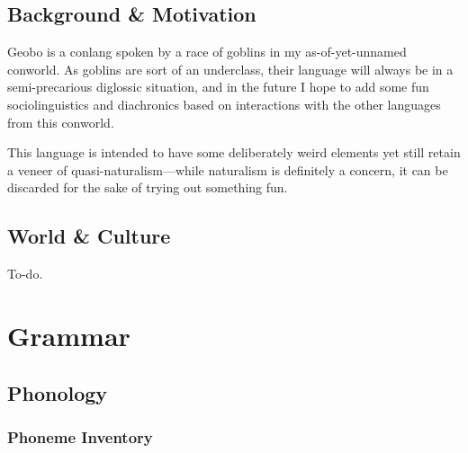 \documentclass[a4paper,11pt,oneside,openany]{memoir}
\begin{document}
\begin{titlingpage}
\titleP
\end{titlingpage}
\frontmatter

\pagestyle{headings}

\chapter{Background \& Motivation}

Geobo{\engma} is a conlang spoken by a race of goblins in my as-of-yet-unnamed conworld. As goblins are sort of an underclass, their language will always be in a semi-precarious diglossic situation, and in the future I hope to add some fun sociolinguistics and diachronics based on interactions with the other languages from this conworld.

This language is intended to have some deliberately weird elements yet still retain a veneer of quasi-naturalism---while naturalism is definitely a concern, it can be discarded for the sake of trying out something fun.

\clearpage
\tableofcontents


\printnoidxglossary[type=\leipzigtype,title={Glossing Abbreviations}]

\chapter{World \& Culture}

To-do. \ToFirst

\mainmatter

\part{Grammar}

\chapter{Phonology}

\section{Phoneme Inventory}

\end{document}

